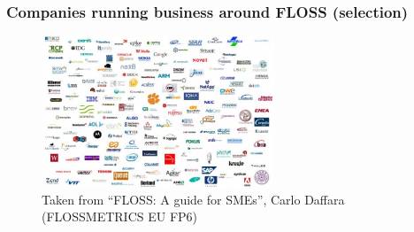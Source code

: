 \begin{frame}
\frametitle{Companies running business around FLOSS (selection)}
\begin{center}
\begin{figure}
 \includegraphics[height=4.5cm]{figs/floss-companies.jpg}
 \caption{\small Taken from ``FLOSS: A guide for SMEs'', Carlo Daffara (FLOSSMETRICS EU FP6)}
\end{figure}
\end{center}
\end{frame}



